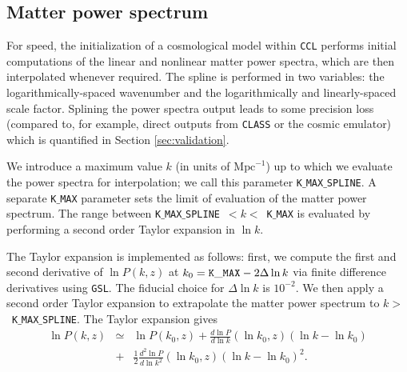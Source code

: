 \documentclass[\docopts]{\docclass}
\begin{document}
\subsection{Matter power spectrum}

For speed, the initialization of a cosmological model within {\tt CCL} performs initial computations of the linear and nonlinear matter power spectra, which are then interpolated whenever required. The spline is performed in two variables: the logarithmically-spaced wavenumber and the logarithmically and linearly-spaced scale factor. Splining the power spectra output leads to some precision loss (compared to, for example, direct outputs from {\tt CLASS} or the cosmic emulator) which is quantified in Section \ref{sec:validation}.

We introduce a maximum value $k$ (in units of $\text{Mpc}^{-1}$) up to which we evaluate the power spectra for interpolation; we call this parameter {\tt K$\_$MAX$\_$SPLINE}. A separate {\tt K$\_$MAX} parameter sets the limit of evaluation of the matter power spectrum. The range between {\tt K$\_$MAX$\_$SPLINE}~$<k<$~{\tt K$\_$MAX} is evaluated by performing a second order Taylor expansion in $\ln k$.

The Taylor expansion is implemented as follows: first, we compute the first and second derivative of $\ln P(k,z)$ at $k_0={\rm \tt K\_MAX}-2\Delta\ln k$ via finite difference derivatives using {\tt GSL}. The fiducial choice for $\Delta\ln k$ is $10^{-2}$. We then apply a second order Taylor expansion to extrapolate the matter power spectrum to $k>$~{\tt K$\_$MAX$\_$SPLINE}. The Taylor expansion gives
%
\begin{eqnarray}
  \ln P(k,z) &\simeq& \ln P(k_0,z) + \frac{d\ln P}{d\ln k}(\ln k_0,z) (\ln k-\ln k_0)  \nonumber\\
  &+& \frac{1}{2}  \frac{d^2\ln P}{d\ln k^2}(\ln k_0,z) (\ln k-\ln k_0)^2.
  \label{eq:NLPSTaylor}
\end{eqnarray}
\end{document}
